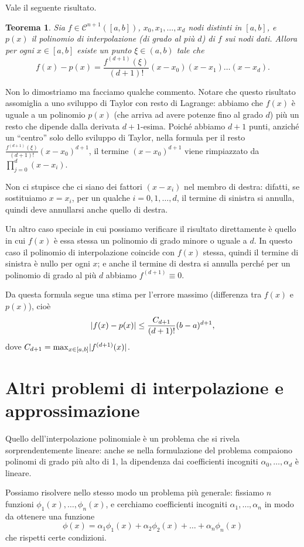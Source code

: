 \documentclass[a4paper]{report}
\DeclarePairedDelimiter{\abs}{\lvert}{\rvert}
\newtheorem{theorem}{Teorema}[chapter]
\theoremstyle{definiton}
\theoremstyle{remark}
\begin{document}
Vale il seguente risultato.
\begin{theorem}
Sia $f\in \mathcal{C}^{n+1}([a,b])$, $x_0,x_1,\dots,x_d$ nodi distinti in $[a,b]$, e $p(x)$ il polinomio di interpolazione (di grado al più $d$) di $f$ sui nodi dati. Allora per ogni $x\in [a,b]$ esiste un punto $\xi \in (a,b)$ tale che
\[
f(x) - p(x) = \frac{f^{(d+1)}(\xi)}{(d+1)!} (x-x_0)(x-x_1) \dots (x-x_d).
\]
\end{theorem}
Non lo dimostriamo ma facciamo qualche commento. Notare che questo risultato assomiglia a uno sviluppo di Taylor con resto di Lagrange: abbiamo che $f(x)$ è uguale a un polinomio $p(x)$ (che arriva ad avere potenze fino al grado $d$) più un resto che dipende dalla derivata $d+1$-esima. Poiché abbiamo $d+1$ punti, anziché un ``centro'' solo dello sviluppo di Taylor, nella formula per il resto $\frac{f^{(d+1)}(\xi)}{(d+1)!}(x-x_0)^{d+1}$, il termine $(x-x_0)^{d+1}$ viene rimpiazzato da $\prod_{j=0}^d (x-x_i)$.

Non ci stupisce che ci siano dei fattori $(x-x_i)$ nel membro di destra: difatti, se sostituiamo $x=x_i$, per un qualche $i=0,1,\dots,d$, il termine di sinistra si annulla, quindi deve annullarsi anche quello di destra.

Un altro caso speciale in cui possiamo verificare il risultato direttamente è quello in cui $f(x)$ è essa stessa un polinomio di grado minore o uguale a $d$. In questo caso il polinomio di interpolazione coincide con $f(x)$ stessa, quindi il termine di sinistra è nullo per ogni $x$; e anche il termine di destra si annulla perché per un polinomio di grado al più $d$ abbiamo $f^{(d+1)} \equiv 0$.

Da questa formula segue una stima per l'errore massimo (differenza tra $f(x)$ e $p(x)$), cioè
\[
\abs{f(x) - p(x)} \leq \frac{C_{d+1}}{(d+1)!}(b-a)^{d+1},
\]
dove $C_{d+1} = \max_{x\in [a,b]} \abs{f^{(d+1)}(x)}$.

\section{Altri problemi di interpolazione e approssimazione}
Quello dell'interpolazione polinomiale è un problema che si rivela sorprendentemente lineare: anche se nella formulazione del problema compaiono polinomi di grado più alto di 1, la dipendenza dai coefficienti incogniti $\alpha_0,\dots, \alpha_d$ è lineare. 

Possiamo risolvere nello stesso modo un problema più generale: fissiamo $n$ funzioni $\phi_1(x), \dots, \phi_n(x)$, e cerchiamo coefficienti incogniti $\alpha_1,\dots,\alpha_n$ in modo da ottenere una funzione
\begin{equation} \label{phi}
    \phi(x) = \alpha_1 \phi_1(x) + \alpha_2 \phi_2(x) + \dots + \alpha_n \phi_n(x)    
\end{equation}
che rispetti certe condizioni.
\end{document}
